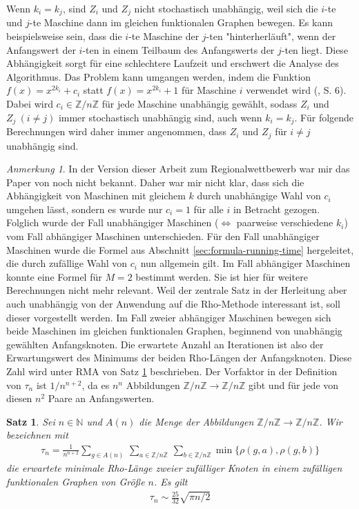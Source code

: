 \documentclass[a4paper, 11pt, ngerman]{article}
\newcommand{\N}{\mathbb{N}}
\newcommand{\Z}{\mathbb{Z}}
\theoremstyle{definition}
\theoremstyle{plain}
\newtheorem{theorem}{Satz}
\theoremstyle{remark}
\newtheorem*{remark*}{Anmerkung}
\begin{document}
Wenn $k_i = k_j$, sind $Z_i$ und $Z_j$ nicht stochastisch unabhängig, weil sich die $i$-te und $j$-te Maschine dann im gleichen funktionalen Graphen bewegen. Es kann beispielsweise sein, dass die $i$-te Maschine der $j$-ten "hinterherläuft", wenn der Anfangswert der $i$-ten in einem Teilbaum des Anfangswerts der $j$-ten liegt. Diese Abhängigkeit sorgt für eine schlechtere Laufzeit und erschwert die Analyse des Algorithmus. Das Problem kann umgangen werden, indem die Funktion $f(x) = x^{2k_i} + c_i$ statt $f(x) = x^{2k_i} + 1$ für Maschine $i$ verwendet wird (\cite{cr99}, S. 6). Dabei wird $c_i \in \Z/n\Z$ für jede Maschine unabhängig gewählt, sodass $Z_i$ und $Z_j \ (i \ne j)$ immer stochastisch unabhängig sind, auch wenn $k_i = k_j$. Für folgende Berechnungen wird daher immer angenommen, dass $Z_i$ und $Z_j$ für $i \ne j$ unabhängig sind.

\begin{remark*}
    In der Version dieser Arbeit zum Regionalwettbewerb war mir das Paper von \cite{cr99} noch nicht bekannt. Daher war mir nicht klar, dass sich die Abhängigkeit von Maschinen mit gleichem $k$ durch unabhängige Wahl von $c_i$ umgehen lässt, sondern es wurde nur $c_i = 1$ für alle $i$ in Betracht gezogen. Folglich wurde der Fall unabhängiger Maschinen ($\Longleftrightarrow$ paarweise verschiedene $k_i$) vom Fall abhängiger Maschinen unterschieden. Für den Fall unabhängiger Maschinen wurde die Formel aus Abschnitt \ref{sec:formula-running-time} hergeleitet, die durch zufällige Wahl von $c_i$ nun allgemein gilt. Im Fall abhängiger Maschinen konnte eine Formel für $M = 2$ bestimmt werden. Sie ist hier für weitere Berechnungen nicht mehr relevant. Weil der zentrale Satz in der Herleitung aber auch unabhängig von der Anwendung auf die Rho-Methode interessant ist, soll dieser vorgestellt werden. Im Fall zweier abhängiger Maschinen bewegen sich beide Maschinen im gleichen funktionalen Graphen, beginnend von unabhängig gewählten Anfangsknoten. Die erwartete Anzahl an Iterationen ist also der Erwartungswert des Minimums der beiden Rho-Längen der Anfangsknoten. Diese Zahl wird unter RMA von Satz \ref{theorem:min-rho-len-m2} beschrieben. Der Vorfaktor in der Definition von $\tau_n$ ist $1/n^{n + 2}$, da es $n^n$ Abbildungen $\Z/n\Z \to \Z/n\Z$ gibt und für jede von diesen $n^2$ Paare an Anfangswerten.
\end{remark*}

\begin{theorem}
    \label{theorem:min-rho-len-m2}
    Sei $n \in \N$ und $A(n)$ die Menge der Abbildungen $\Z/n\Z \to \Z/n\Z$. Wir bezeichnen mit
    \begin{align*}
        \tau_n =  \frac 1 {n^{n + 2}}
        \sum_{g \in A(n)} \, \sum_{a \in \Z/n\Z} \, \sum_{b \in \Z/n\Z}
        \min\{\rho(g, a), \rho(g, b)\}
    \end{align*}
    die erwartete minimale Rho-Länge zweier zufälliger Knoten in einem zufälligen funktionalen Graphen von Größe $n$.  Es gilt
    \begin{align*}
        \tau_n \sim \frac {25} {32} \sqrt{\pi n / 2}
    \end{align*}
\end{theorem}
\end{document}
